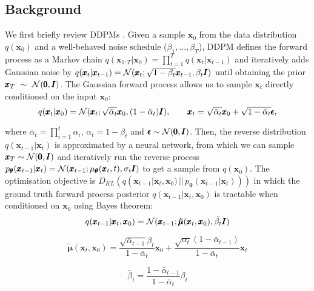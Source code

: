 \documentclass{article} \usepackage{iclr2024_conference,times}
\begin{document}
\subsection{Background}
We first briefly review DDPMs \citep{DDPM}. Given a sample $\pmb{x}_0$ from the data distribution $q(\pmb{x}_0)$ 
and a well-behaved noise schedule ($\beta_1, ..., \beta_T$), DDPM defines the forward process as a Markov chain $q(\pmb{x}_{1:T} | \pmb{x}_0) = \prod_{t=1}^T q(\pmb{x}_t | \pmb{x}_{t-1})$ and iteratively adds Gaussian noise by $q(\pmb{x}_t | \pmb{x}_{t-1}) = {\cal N} (\pmb{x}_t; \sqrt{1- \beta_t} \pmb{x}_{t-1}, \beta_t \pmb{I})$ until obtaining the prior $\pmb{x}_T~\sim~{\cal N} (\pmb{0}, \pmb{I})$. The Gaussian forward process allows us to sample $\pmb{x}_t$ directly conditioned on the input $\pmb{x}_0$:
\begin{equation}
\label{eq4}
q(\pmb{x}_t | \pmb{x}_0) = {\cal N} (\pmb{x}_t; \sqrt{\bar{\alpha}_t} \pmb{x}_0, (1-\bar{\alpha}_t) \pmb{I}), \qquad \pmb{x}_t = \sqrt{\bar{\alpha}_t} \pmb{x}_0 +   \sqrt{1 - \bar{\alpha}_t} \pmb{\epsilon},
\end{equation}

\noindent
where $\bar{\alpha}_t = \prod_{i=1}^t \alpha_i$, $\alpha_t = 1-\beta_t$ and $\pmb{\epsilon} \sim {\cal N} (\pmb{0}, \pmb{I})$.
Then, the reverse distribution $q(\pmb{x}_{t-1}|\pmb{x}_t)$ is approximated by a neural network, from which we can sample $\pmb{x}_T \sim {\cal N} (\pmb{0},\pmb{I})$ and iteratively run the reverse process $p_{\pmb{\theta}}(\pmb{x}_{t-1} | \pmb{x}_t) = {\cal N} (\pmb{x}_{t-1}; \mu_{\pmb{\theta}}(\pmb{x}_t, t), \sigma_t \pmb{I})$ to get a sample from $q(\pmb{x}_0)$. The optimisation objective is $D_{KL}(q(\pmb{x}_{t-1}|\pmb{x}_{t},\pmb{x}_{0}) \,||\, p_{\pmb{\theta}}(\pmb{x}_{t-1}|\pmb{x}_{t})))$ in which the ground truth forward process posterior $q(\pmb{x}_{t-1}|\pmb{x}_{t},\pmb{x}_{0})$ is tractable when conditioned on $\pmb{x}_0$ using Bayes theorem:
\begin{equation}
\label{eq7}
q(\pmb{x}_{t-1} | \pmb{x}_{t}, \pmb{x}_{0}) = {\cal N} (\pmb{x}_{t-1}; \pmb{\tilde{\mu}}(\pmb{x}_t, \pmb{x}_0), \tilde{\beta_t} \pmb{I})
\end{equation}

\begin{figure}[ht]
\vskip -0.2in
    \begin{minipage}{0.59\linewidth}
        \begin{equation}
            \label{eq8}
            \pmb{\tilde{\mu}}(\pmb{x}_t, \pmb{x}_0) = \frac{\sqrt{\bar{\alpha}_{t-1}} \beta_{t}}{1-\bar{\alpha}_{t}} \pmb{x}_{0} + \frac{\sqrt{\alpha_{t}}(1-\bar{\alpha}_{t-1})}{1-\bar{\alpha}_{t}} \pmb{x}_{t}
        \end{equation}
    \end{minipage}
    \hfill
    \begin{minipage}{0.39\linewidth}
        \begin{equation}
            \label{eq9}
            \tilde{\beta_{t}} = \frac{1-\bar{\alpha}_{t-1}}{1-\bar{\alpha}_{t}}\beta_{t}
        \end{equation}
    \end{minipage}
\end{figure}
\end{document}
